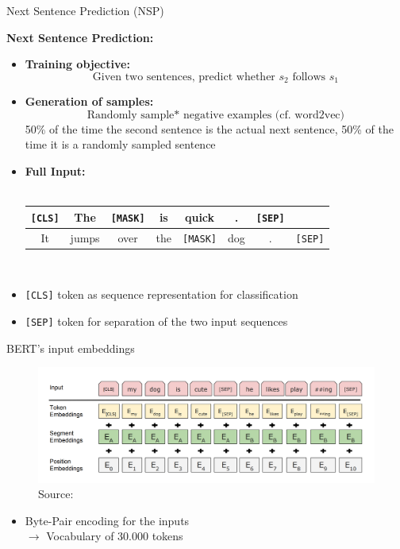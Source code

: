\documentclass[]{beamer}
\begin{document}
\begin{frame}{Next Sentence Prediction (NSP)}

\textbf{Next Sentence Prediction:}

\begin{itemize}
\item \textbf{Training objective:} $$\text{Given two sentences, predict whether $s_2$ follows $s_1$}$$
\item \textbf{Generation of samples:} $$\text{Randomly sample* negative examples (cf. word2vec)}$$
  \scriptsize *50\% of the time the second sentence is the actual next sentence, 50\% of the time it is a randomly sampled sentence
\item \normalsize \textbf{Full Input:}\\\mbox{}\\
			\footnotesize
\begin{center}
\begin{tabular}{|cccccccc|}
\hline
\cellcolor{blue!15}\texttt{[CLS]} & The & \cellcolor{blue!65}\texttt{[MASK]} & is & quick & . & \cellcolor{blue!15}\texttt{[SEP]} &\\\hline\hline It & jumps & over & the & \cellcolor{blue!65}\texttt{[MASK]} & dog & . & \cellcolor{blue!15}\texttt{[SEP]} \\
\hline
\end{tabular}\\\mbox{}
\end{center}
\item \normalsize \texttt{[CLS]} token as sequence representation for classification
\item \texttt{[SEP]} token for separation of the two input sequences
\end{itemize}
\end{frame}



\begin{frame}{BERT's input embeddings}
\begin{figure}
\centering
\includegraphics[width = 12cm]{figure/bert-input.png}\\ 
\footnotesize{Source:} \href{https://arxiv.org/pdf/1810.04805.pdf}{}
\end{figure}

	\begin{itemize}
		\item Byte-Pair encoding \href{https://www.aclweb.org/anthology/P16-1162.pdf}{} for the inputs\\
				$\rightarrow$ Vocabulary of 30.000 tokens
	\end{itemize}
\end{frame}
\end{document}

